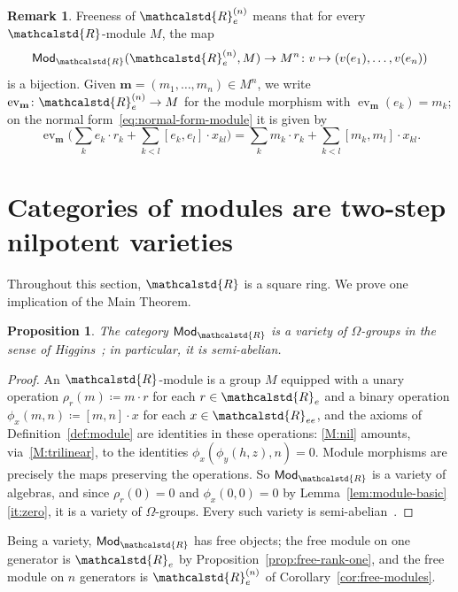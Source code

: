 \documentclass[reqno,a4paper]{amsart}
\theoremstyle{plain}
\newtheorem{proposition}[subsection]{Proposition}
\theoremstyle{definition}
\newtheorem{remark}[subsection]{Remark}
\newcommand{\DefEq}{\coloneq}
\newcommand{\R}{\ensuremath{\mathcalstd{R}}}
\newcommand{\Mod}{\ensuremath{\mathsf{Mod}}}
\DeclareMathOperator{\ev}{ev}
\renewcommand{\Re}{\ensuremath{\R_{e}}}
\newcommand{\Ree}{\ensuremath{\R_{ee}}}
\newcommand{\brk}[2]{\ensuremath{[#1,#2]}}
\begin{document}
\begin{remark}\label{rem:freeness}
  Freeness of \(\Re^{(n)}\) means that for every \(\R\)-module \(M\), the map
  \[
    \Mod_{\R}(\Re^{(n)},M)\to M^{n}\colon v\mapsto(v(e_{1}),\dots,v(e_{n}))
  \]
  is a bijection. Given \(\mathbf{m}=(m_{1},\dots,m_{n})\in M^{n}\), we write \(\ev_{\mathbf{m}}\colon \Re^{(n)}\to M\) for the module morphism with \(\ev_{\mathbf{m}}(e_{k})=m_{k}\); on the normal form~\eqref{eq:normal-form-module} it is given by
  \[
    \ev_{\mathbf{m}}\bigl(\sum_{k}e_{k}\cdot r_{k}+\sum_{k<l}\brk{e_{k}}{e_{l}}\cdot x_{kl}\bigr)=\sum_{k}m_{k}\cdot r_{k}+\sum_{k<l}\brk{m_{k}}{m_{l}}\cdot x_{kl}\text{.}
  \]
\end{remark}

\section{Categories of modules are two-step nilpotent varieties}\label{sec:modules-nilpotent}

Throughout this section, \(\R\) is a square ring. We prove one implication of the Main Theorem.

\begin{proposition}\label{prop:mod-semi-abelian}
  The category \(\Mod_{\R}\) is a variety of \(\Omega\)-groups in the sense of Higgins~\cite{Higgins}; in particular, it is semi-abelian.
\end{proposition}

\begin{proof}
  An \(\R\)-module is a group \(M\) equipped with a unary operation \(\rho_{r}(m)\DefEq m\cdot r\) for each \(r\in\Re\) and a binary operation \(\phi_{x}(m,n)\DefEq\brk{m}{n}\cdot x\) for each \(x\in\Ree\), and the axioms of Definition~\ref{def:module} are identities in these operations: \ref{M:nil} amounts, via~\ref{M:trilinear}, to the identities \(\phi_{x}(\phi_{y}(h,z),n)=0\). Module morphisms are precisely the maps preserving the operations. So \(\Mod_{\R}\) is a variety of algebras, and since \(\rho_{r}(0)=0\) and \(\phi_{x}(0,0)=0\) by Lemma~\ref{lem:module-basic}\ref{it:zero}, it is a variety of \(\Omega\)-groups. Every such variety is semi-abelian~\cite[Example~2.6(2)]{Janelidze-Marki-Tholen}.
\end{proof}

Being a variety, \(\Mod_{\R}\) has free objects; the free module on one generator is \(\Re\) by Proposition~\ref{prop:free-rank-one}, and the free module on \(n\) generators is \(\Re^{(n)}\) of Corollary~\ref{cor:free-modules}.
\end{document}

